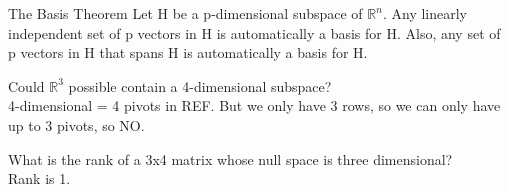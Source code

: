 \begin{imp:thm}{The Basis Theorem}{} Let H be a p-dimensional subspace of $\mathbb{R}^n$. Any linearly independent set of p vectors in H is automatically a basis for H. Also, any set of p vectors in H that spans H is automatically a basis for H.
\end{imp:thm}
\begin{ex}
Could $\mathbb{R}^3$ possible contain a 4-dimensional subspace?\\
4-dimensional = 4 pivots in REF. But we only have 3 rows, so we can only have up to 3 pivots, so NO.
\end{ex}
\begin{ex}
What is the rank of a 3x4 matrix whose null space is three dimensional?\\
Rank is 1.
\end{ex}